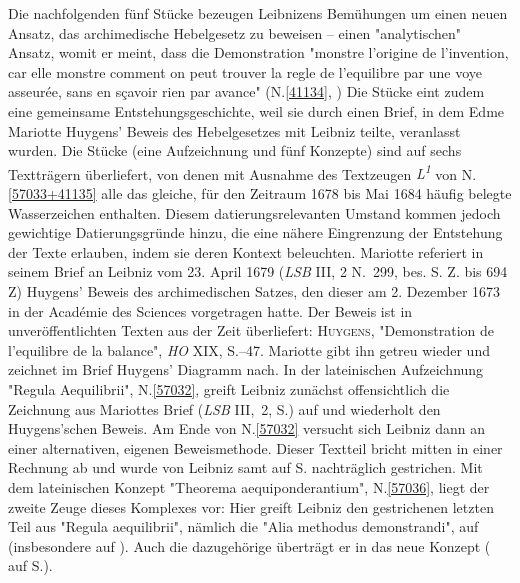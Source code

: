 
\begin{ledgroup}
\footnotesize
\pstart
\noindent
Die nachfolgenden fünf Stücke bezeugen Leibnizens Bemühungen um einen neuen Ansatz, das archimedische Hebelgesetz zu beweisen -- 
einen "analytischen" Ansatz, womit er meint, dass die Demonstration "monstre l'origine de l'invention,
car elle monstre comment on peut trouver la regle
de l'equilibre par une voye asseurée, 
sans en sçavoir rien par avance" (N.\;\ref{41134}, )
Die Stücke eint zudem eine gemeinsame Entstehungsgeschichte, weil sie durch einen
Brief, in dem 
Edme Mariotte
Huygens' Beweis des Hebelgesetzes mit Leibniz teilte, veranlasst wurden.
\pend
\pstart
Die Stücke (eine Aufzeichnung und fünf Konzepte) sind auf sechs Textträgern überliefert, von denen mit Ausnahme des Textzeugen \textit{L\textsuperscript{1}} von N.\;\ref{57033+41135} alle das gleiche, für den Zeitraum 1678 bis Mai 1684 häufig belegte Wasserzeichen enthalten.
Diesem datierungsrelevanten Umstand kommen jedoch gewichtige Datierungsgründe hinzu, die eine nähere Eingrenzung der Entstehung der Texte erlauben, indem sie deren Kontext beleuchten.
\pend
\pstart
Mariotte referiert in seinem Brief an Leibniz vom 23. April 1679 (\cite{02152}\textit{LSB} III, 2 N.~299, bes. S. Z. bis 694 Z)
Huygens' Beweis des archimedischen Satzes, den dieser am 2. Dezember 1673 in der Académie des Sciences vorgetragen hatte. Der Beweis ist in unveröffentlichten Texten aus der Zeit überliefert:
\textsc{Huygens}, \cite{02161}"Demonstration de l'equilibre de la balance", \textit{HO} XIX, S.--47.
Mariotte gibt ihn getreu wieder und zeichnet im Brief Huygens' Diagramm nach.
\pend
\pstart
In der lateinischen Aufzeichnung "Regula Aequilibrii", N.\;\ref{57032}, greift Leibniz zunächst offensichtlich die Zeichnung aus Mariottes Brief (\textit{LSB} III,~2, S.) auf und wiederholt den Huygens'schen Beweis.
Am Ende von N.\;\ref{57032} versucht sich Leibniz dann an einer alternativen, eigenen Beweismethode. Dieser Textteil bricht mitten in einer Rechnung ab und wurde von Leibniz samt  auf S.\;\pageref{Fig:37_03_063:Fig_3} nachträglich gestrichen.
\pend
\pstart
Mit dem lateinischen Konzept "Theorema aequiponderantium", N.\;\ref{57036}, liegt der zweite Zeuge dieses Komplexes vor: Hier greift Leibniz den gestrichenen letzten Teil aus "Regula aequilibrii", nämlich die "Alia methodus demonstrandi", auf (insbesondere auf ). Auch die dazugehörige  überträgt er in das neue Konzept ( auf S.\;\pageref{Fig:37_03_082-083:Fig_2}).

\end{ledgroup}
